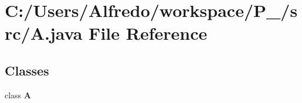 \section{C\+:/\+Users/\+Alfredo/workspace/\+P\+\_/src/A.java File Reference}
\label{_a_8java}
\subsection*{Classes}
\begin{DoxyCompactItemize}
\item 
class {\bf A}
\end{DoxyCompactItemize}
